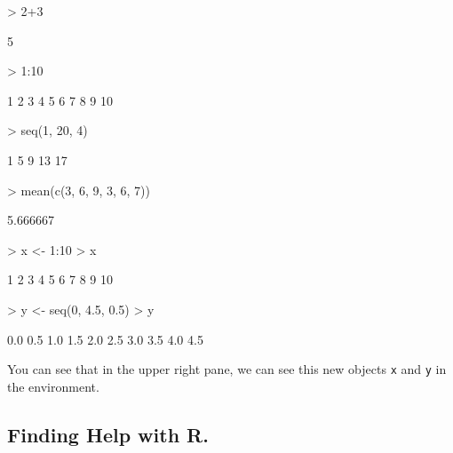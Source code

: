 \documentclass[a4paper,12pt]{article}
\begin{document}
\begin{shaded}
\begin{Schunk}
\begin{Sinput}
> 2+3
\end{Sinput}
\begin{Soutput}
[1] 5
\end{Soutput}
\begin{Sinput}
> 1:10
\end{Sinput}
\begin{Soutput}
 [1]  1  2  3  4  5  6  7  8  9 10
\end{Soutput}
\begin{Sinput}
> seq(1, 20, 4)
\end{Sinput}
\begin{Soutput}
[1]  1  5  9 13 17
\end{Soutput}
\begin{Sinput}
> mean(c(3, 6, 9, 3, 6, 7))
\end{Sinput}
\begin{Soutput}
[1] 5.666667
\end{Soutput}
\end{Schunk}
\end{shaded}


\begin{shaded}
\begin{Schunk}
\begin{Sinput}
> x <- 1:10
> x
\end{Sinput}
\begin{Soutput}
 [1]  1  2  3  4  5  6  7  8  9 10
\end{Soutput}
\begin{Sinput}
> y <- seq(0, 4.5, 0.5)
> y
\end{Sinput}
\begin{Soutput}
 [1] 0.0 0.5 1.0 1.5 2.0 2.5 3.0 3.5 4.0 4.5
\end{Soutput}
\end{Schunk}
\end{shaded}


You can see that in the upper right pane, we can see this new objects \texttt{x} and \texttt{y} in the environment.

\subsection {Finding Help with R.}
\end{document}
